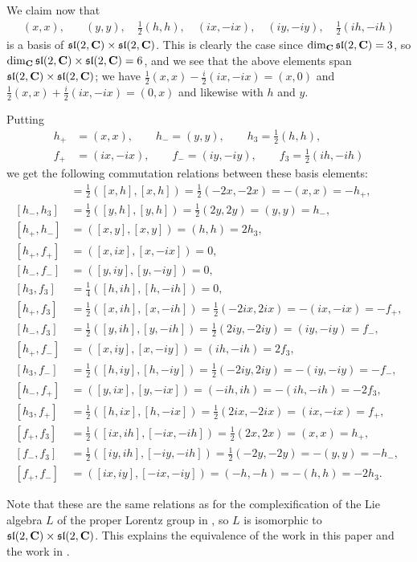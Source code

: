 We claim now that
\begin{align*}
  (x,x),& \quad (y,y), \quad \tfrac{1}{2}(h,h), \quad (ix,-ix), \quad (iy,-iy), \quad \tfrac{1}{2}(ih,-ih)
\end{align*}
is a basis of $\mathfrak{sl}(2,\mathbf{C})\times \mathfrak{sl}(2,\mathbf{C})$. This is clearly the case since $\dim_{\mathbf{C}} \mathfrak{sl}(2,\mathbf{C}) = 3$, so $\dim_{\mathbf{C}} \mathfrak{sl}(2,\mathbf{C})\times \mathfrak{sl}(2,\mathbf{C}) = 6$, and we see that the above elements span $\mathfrak{sl}(2,\mathbf{C})\times \mathfrak{sl}(2,\mathbf{C})$; we have $\tfrac{1}{2}(x,x)-\tfrac{i}{2}(ix,-ix)=(x,0)$ and $\tfrac{1}{2}(x,x)+\tfrac{i}{2}(ix,-ix)=(0,x)$ and likewise with $h$ and $y$. 

Putting
\begin{align*}
  h_+&=(x,x), \qquad h_-=(y,y), \qquad h_3=\tfrac{1}{2}(h,h), \\
  f_+&=(ix,-ix), \qquad f_-=(iy,-iy), \qquad f_3=\tfrac{1}{2}(ih,-ih)
\end{align*}
we get the following commutation relations between these basis elements:
\begin{align*}
  [h_+,h_3] &= \tfrac{1}{2}([x,h],[x,h]) = \tfrac{1}{2}(-2x,-2x) = -(x,x) = -h_+, \\
  [h_-,h_3] &= \tfrac{1}{2}([y,h],[y,h]) = \tfrac{1}{2}(2y,2y) = (y,y) = h_-, \\
  [h_+,h_-] &= ([x,y],[x,y]) = (h,h) = 2h_3, \\
  [h_+,f_+] &= ([x,ix],[x,-ix]) = 0, \\
  [h_-,f_-] &= ([y,iy],[y,-iy]) = 0, \\
  [h_3,f_3] &= \tfrac{1}{4}([h,ih],[h,-ih]) = 0, \\
  [h_+,f_3] &= \tfrac{1}{2}([x,ih],[x,-ih]) = \tfrac{1}{2}(-2ix,2ix) = -(ix,-ix) = -f_+, \\
  [h_-,f_3] &= \tfrac{1}{2}([y,ih],[y,-ih]) = \tfrac{1}{2}(2iy,-2iy) = (iy,-iy) = f_-, \\
  [h_+,f_-] &= ([x,iy],[x,-iy]) = (ih,-ih) = 2f_3, \\
  [h_3,f_-] &= \tfrac{1}{2}([h,iy],[h,-iy]) = \tfrac{1}{2}(-2iy,2iy) = -(iy,-iy) = -f_-, \\
  [h_-,f_+] &= ([y,ix],[y,-ix]) = (-ih,ih) = -(ih,-ih) = -2f_3, \\
  [h_3,f_+] &= \tfrac{1}{2}([h,ix],[h,-ix]) = \tfrac{1}{2}(2ix,-2ix) = (ix,-ix) = f_+, \\
  [f_+,f_3] &= \tfrac{1}{2}([ix,ih],[-ix,-ih]) = \tfrac{1}{2}(2x,2x) = (x,x) = h_+, \\
  [f_-,f_3] &= \tfrac{1}{2}([iy,ih],[-iy,-ih]) = \tfrac{1}{2}(-2y,-2y) = -(y,y) = -h_-, \\
  [f_+,f_-] &= ([ix,iy],[-ix,-iy]) = (-h,-h) = -(h,h) = -2h_3.
\end{align*}

\begin{remark}
  Note that these are the same relations as for the complexification of the Lie algebra $L$ of the proper Lorentz group in \cite[5]{indecompReprOfLorGr}, so $L$ is isomorphic to $\mathfrak{sl}(2,\mathbf{C})\times \mathfrak{sl}(2,\mathbf{C})$. This explains the equivalence of the work in this paper and the work in \cite{classifOfIndec,catOfHarChaMod,indecompReprOfLorGr}.
\end{remark}
